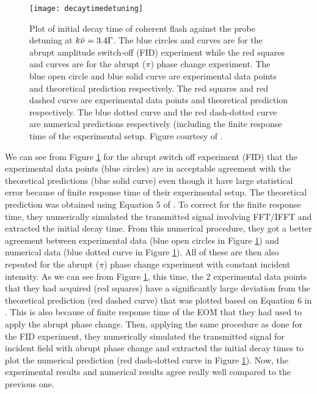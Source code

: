 \begin{figure}[h!]
    \centering
    \texttt{[image: decaytimedetuning]}
    \caption{Plot of initial decay time of coherent flash against the probe detuning at $k \Bar{\nu} = 3.4\Gamma$. The blue circles and curves are for the abrupt amplitude switch-off (FID) experiment while the red squares and curves are for the abrupt ($\pi$) phase change experiment. The blue open circle and blue solid curve are experimental data points and theoretical prediction respectively. The red squares and red dashed curve are experimental data points and theoretical prediction respectively. The blue dotted curve and the red dash-dotted curve are numerical predictions respectively (including the finite response time of the experimental setup. Figure courtesy of \cite{Kwong2015}.}
    \label{fig: decaytimedetuning}
\end{figure}

\newpage

We can see from Figure \ref{fig: decaytimedetuning} for the abrupt switch off experiment (FID) that the experimental data points (blue circles) are in acceptable agreement with the theoretical predictions (blue solid curve) even though it have large statistical error because of finite response time of their experimental setup. The theoretical prediction was obtained using Equation 5 of \cite{Kwong2015}. To correct for the finite response time, they numerically simulated the transmitted signal involving FFT/IFFT and extracted the initial decay time. From this numerical procedure, they got a better agreement between experimental data (blue open circles in Figure \ref{fig: decaytimedetuning}) and numerical data (blue dotted curve in Figure \ref{fig: decaytimedetuning}). All of these are then also repeated for the abrupt ($\pi$) phase change experiment with constant incident intensity. As we can see from Figure \ref{fig: decaytimedetuning}, this time, the 2 experimental data points that they had acquired (red squares) have a significantly large deviation from the theoretical prediction (red dashed curve) that was plotted based on Equation 6 in \cite{Kwong2015}. This is also because of finite response time of the EOM that they had used to apply the abrupt phase change. Then, applying the same procedure as done for the FID experiment, they numerically simulated the transmitted signal for incident field with abrupt phase change and extracted the initial decay times to plot the numerical prediction (red dash-dotted curve in Figure \ref{fig: decaytimedetuning}). Now, the experimental results and numerical results agree really well compared to the previous one.\\

